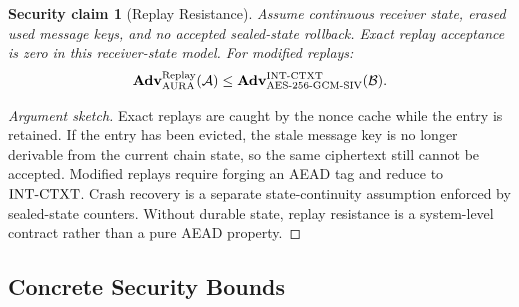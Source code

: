 \documentclass[preprint,12pt]{elsarticle}
\newtheorem{securityclaim}[theorem]{Security claim}
\theoremstyle{definition}
\newcommand{\tech}[1]{\textnormal{#1}}
\newcommand{\adv}{\mathbf{Adv}}
\newcommand{\advA}{\mathcal{A}}
\newcommand{\advB}{\mathcal{B}}
\newcommand{\AEAD}{\tech{AES-256-GCM-SIV}}
\newcommand{\INTCTXT}{\tech{INT-CTXT}}
\begin{document}
\begin{securityclaim}[Replay Resistance]\label{thm:replay}
Assume continuous receiver state, erased used message keys, and no accepted
sealed-state rollback. Exact replay acceptance is zero in this receiver-state
model. For modified replays:
\begin{equation}\label{eq:replay-bound}
  \adv^{\mathrm{Replay}}_{\mathrm{AURA}}(\advA) \leq \adv^{\INTCTXT}_{\AEAD}(\advB).
\end{equation}
\end{securityclaim}

\begin{proof}[Argument sketch]
Exact replays are caught by the nonce cache while the entry is retained. If the entry has been evicted, the stale message key is no longer derivable from the current chain state, so the same ciphertext still cannot be accepted. Modified replays require forging an AEAD tag and reduce to $\INTCTXT$. Crash recovery is a separate state-continuity assumption enforced by sealed-state counters. Without durable state, replay resistance is a system-level contract rather than a pure AEAD property.
\end{proof}

\subsection{Concrete Security Bounds}
\end{document}
